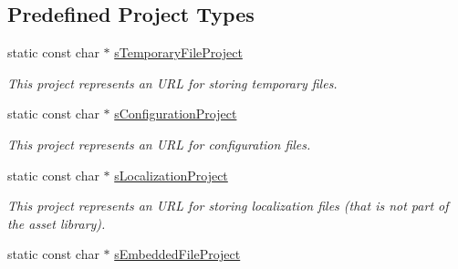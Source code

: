 \subsection*{Predefined Project Types}
\begin{DoxyCompactItemize}
\item 
static const char $\ast$ \hyperlink{class_fbx_x_ref_manager_ac1e95d1bc9cb30f5e9c75f08791e286f}{s\+Temporary\+File\+Project}
\begin{DoxyCompactList}\small\item\em This project represents an U\+RL for storing temporary files. \end{DoxyCompactList}\item 
static const char $\ast$ \hyperlink{class_fbx_x_ref_manager_a2b587f862e487323d69830ecb3c148a3}{s\+Configuration\+Project}
\begin{DoxyCompactList}\small\item\em This project represents an U\+RL for configuration files. \end{DoxyCompactList}\item 
static const char $\ast$ \hyperlink{class_fbx_x_ref_manager_ac37aa54c7d0914ed376e7f4dd6f51229}{s\+Localization\+Project}
\begin{DoxyCompactList}\small\item\em This project represents an U\+RL for storing localization files (that is not part of the asset library). \end{DoxyCompactList}\item 
static const char $\ast$ \hyperlink{class_fbx_x_ref_manager_a9d815646f6d592942ce288a4de5eb39d}{s\+Embedded\+File\+Project}
\end{DoxyCompactItemize}
